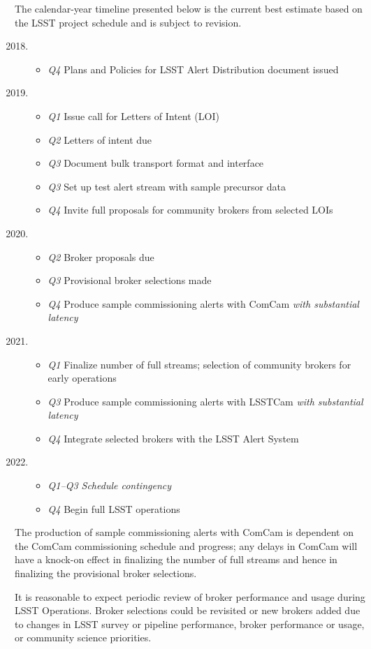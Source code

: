 The calendar-year timeline presented below is the current best estimate based on the LSST project schedule and is subject to revision.
{
	\renewcommand\labelenumi{\textbf{\theenumi}}
\begin{enumerate}
  \setcounter{enumi}{2017}
	\item \begin{itemize} %
		\item \textit{Q4} Plans and Policies for LSST Alert Distribution document issued
	\end{itemize}
	\item \begin{itemize}%
		\item \textit{Q1} Issue call for Letters of Intent (LOI)
		\item \textit{Q2} Letters of intent due 
		\item \textit{Q3} Document bulk transport format and interface
		\item \textit{Q3} Set up test alert stream with sample precursor data
		\item \textit{Q4} Invite full proposals for community brokers from selected LOIs
		\end{itemize}
	\item \begin{itemize} %
		\item \textit{Q2} Broker proposals due
		\item \textit{Q3} Provisional broker selections made
		\item \textit{Q4} Produce sample commissioning alerts with ComCam \textit{with substantial latency}
		\end{itemize}
	\item \begin{itemize} %
		\item \textit{Q1} Finalize number of full streams;
		selection of community brokers for early operations
		\item \textit{Q3} Produce sample commissioning alerts with LSSTCam \textit{with substantial latency}
		\item \textit{Q4} Integrate selected brokers with the LSST Alert System
		\end{itemize}

	\item \begin{itemize} %
		\item \textit{Q1--Q3 Schedule contingency} 
		\item \textit{Q4} Begin full LSST operations
	\end{itemize}

\end{enumerate}
}

The production of sample commissioning alerts with ComCam is dependent on the ComCam commissioning schedule and progress; any delays in ComCam will have a knock-on effect in finalizing the number of full streams and hence in finalizing the provisional broker selections.

It is reasonable to expect periodic review of broker performance and usage during LSST Operations.
Broker selections could be revisited or new brokers added due to changes in LSST survey or pipeline performance, broker performance or usage, or community science priorities.
